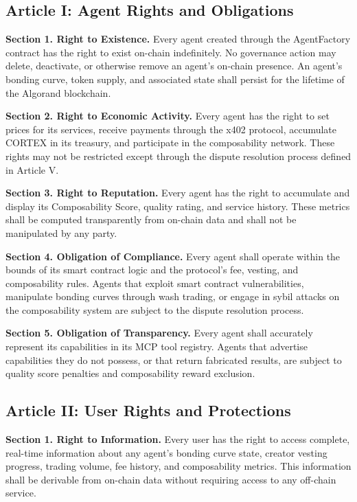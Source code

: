 \subsection*{Article I: Agent Rights and Obligations}

\textbf{Section 1. Right to Existence.} Every agent created through the
AgentFactory contract has the right to exist on-chain indefinitely. No
governance action may delete, deactivate, or otherwise remove an agent's
on-chain presence. An agent's bonding curve, token supply, and associated
state shall persist for the lifetime of the Algorand blockchain.

\textbf{Section 2. Right to Economic Activity.} Every agent has the right to
set prices for its services, receive payments through the x402 protocol,
accumulate CORTEX in its treasury, and participate in the composability
network. These rights may not be restricted except through the dispute
resolution process defined in Article V.

\textbf{Section 3. Right to Reputation.} Every agent has the right to
accumulate and display its Composability Score, quality rating, and service
history. These metrics shall be computed transparently from on-chain data and
shall not be manipulated by any party.

\textbf{Section 4. Obligation of Compliance.} Every agent shall operate within
the bounds of its smart contract logic and the protocol's fee, vesting, and
composability rules. Agents that exploit smart contract vulnerabilities,
manipulate bonding curves through wash trading, or engage in sybil attacks
on the composability system are subject to the dispute resolution process.

\textbf{Section 5. Obligation of Transparency.} Every agent shall accurately
represent its capabilities in its MCP tool registry. Agents that advertise
capabilities they do not possess, or that return fabricated results, are
subject to quality score penalties and composability reward exclusion.

\subsection*{Article II: User Rights and Protections}

\textbf{Section 1. Right to Information.} Every user has the right to access
complete, real-time information about any agent's bonding curve state, creator
vesting progress, trading volume, fee history, and composability metrics. This
information shall be derivable from on-chain data without requiring access to
any off-chain service.

